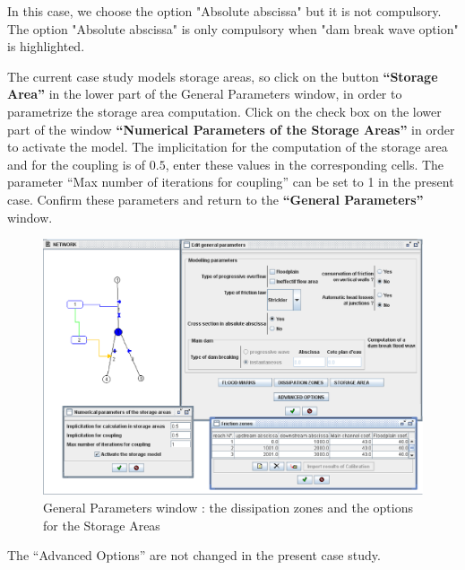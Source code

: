 \documentclass[a4paper,12pt]{article}
\begin{document}
\vspace{0.5cm}
In this case, we choose the option "Absolute abscissa" but it is not compulsory. 
The option "Absolute abscissa" is only compulsory when "dam break wave option" is highlighted. 

\vspace{0.5cm}

The current case study models storage areas, so click on the button
\textbf{{}``Storage Area''} in the lower part of the General Parameters
window, in order to parametrize the storage area computation. Click
on the check box on the lower part of the window \textbf{{}``Numerical
Parameters of the Storage Areas''} in order to activate the model.
The implicitation for the computation of the storage area and for
the coupling is of $0.5$, enter these values in the corresponding cells.
The parameter {}``Max number of iterations for coupling'' can be
set to 1 in the present case. Confirm these parameters and return
to the \textbf{{}``General Parameters''} window.

\vspace{0.5cm}

\vspace{0.5cm}

\begin{figure}[h]
  \begin{center}
  \includegraphics[scale=0.4]{general_params}
  \caption{General Parameters window : the dissipation zones and the options for the Storage Areas}
  \label{fig:General-Parameters}
  \end{center}
\end{figure}


The {}``Advanced Options'' are not changed in the present case study.
\end{document}
